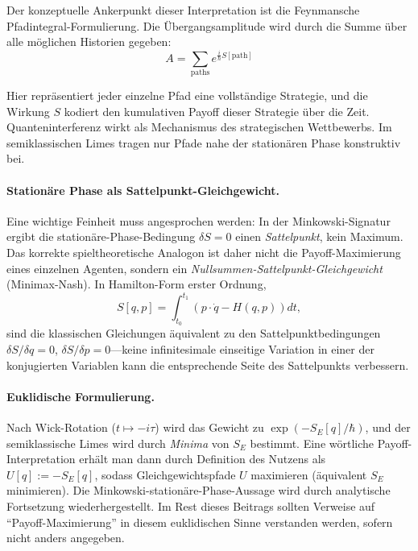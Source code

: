 \documentclass[12pt,a4paper]{article}
\theoremstyle{remark}
\begin{document}
Der konzeptuelle Ankerpunkt dieser Interpretation ist die Feynmansche Pfadintegral-Formulierung. Die \"Ubergangsamplitude wird durch die Summe \"uber alle m\"oglichen Historien gegeben:
\begin{equation}
A = \sum_{\text{paths}} e^{\frac{i}{\hbar} S[\text{path}]}
\end{equation}

Hier repr\"asentiert jeder einzelne Pfad eine vollst\"andige Strategie, und die Wirkung $S$ kodiert den kumulativen Payoff dieser Strategie \"uber die Zeit. Quanteninterferenz wirkt als Mechanismus des strategischen Wettbewerbs. Im semiklassischen Limes tragen nur Pfade nahe der station\"aren Phase konstruktiv bei.

\paragraph{Station\"are Phase als Sattelpunkt-Gleichgewicht.}
Eine wichtige Feinheit muss angesprochen werden: In der Minkowski-Signatur ergibt die station\"are-Phase-Bedingung $\delta S = 0$ einen \emph{Sattelpunkt}, kein Maximum. Das korrekte spieltheoretische Analogon ist daher nicht die Payoff-Maximierung eines einzelnen Agenten, sondern ein \emph{Nullsummen-Sattelpunkt-Gleichgewicht} (Minimax-Nash). In Hamilton-Form erster Ordnung,
\begin{equation}
S[q,p] = \int_{t_0}^{t_1} \left( p \cdot \dot{q} - H(q,p) \right) dt,
\end{equation}
sind die klassischen Gleichungen \"aquivalent zu den Sattelpunktbedingungen $\delta S / \delta q = 0$, $\delta S / \delta p = 0$---keine infinitesimale einseitige Variation in einer der konjugierten Variablen kann die entsprechende Seite des Sattelpunkts verbessern.

\paragraph{Euklidische Formulierung.}
Nach Wick-Rotation ($t \mapsto -i\tau$) wird das Gewicht zu $\exp(-S_E[q]/\hbar)$, und der semiklassische Limes wird durch \emph{Minima} von $S_E$ bestimmt. Eine w\"ortliche Payoff-Interpretation erh\"alt man dann durch Definition des Nutzens als $U[q] := -S_E[q]$, sodass Gleichgewichtspfade $U$ maximieren (\"aquivalent $S_E$ minimieren). Die Minkowski-station\"are-Phase-Aussage wird durch analytische Fortsetzung wiederhergestellt. Im Rest dieses Beitrags sollten Verweise auf ``Payoff-Maximierung'' in diesem euklidischen Sinne verstanden werden, sofern nicht anders angegeben.
\end{document}
